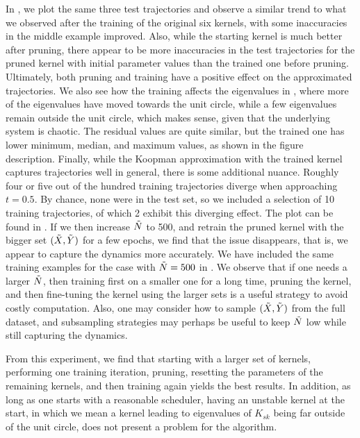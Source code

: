 \documentclass{article}
\begin{document}
In , we plot the same three test trajectories and observe a similar trend to what we observed after the training of the original six kernels, with some inaccuracies in the middle example improved. Also, while the starting kernel is much better after pruning, there appear to be more inaccuracies in the test trajectories for the pruned kernel with initial parameter values than the trained one before pruning. Ultimately, both pruning and training have a positive effect on the approximated trajectories. We also see how the training affects the eigenvalues in , where more of the eigenvalues have moved towards the unit circle, while a few eigenvalues remain outside the unit circle, which makes sense, given that the underlying system is chaotic. The residual values are quite similar, but the trained one has lower minimum, median, and maximum values, as shown in the figure description. Finally, while the Koopman approximation with the trained kernel captures trajectories well in general, there is some additional nuance. Roughly four or five out of the hundred training trajectories diverge when approaching \(t=0.5\). By chance, none were in the test set, so we included a selection of 10 training trajectories, of which 2 exhibit this diverging effect. The plot can be found in . If we then increase \(\Tilde N\) to 500, and retrain the pruned kernel with the bigger set \((\Tilde X, \Tilde Y)\) for a few epochs, we find that the issue disappears, that is, we appear to capture the dynamics more accurately. We have included the same training examples for the case with \(\Tilde N = 500\) in . We observe that if one needs a larger \(\Tilde N\), then training first on a smaller one for a long time, pruning the kernel, and then fine-tuning the kernel using the larger sets is a useful strategy to avoid costly computation. Also, one may consider how to sample \((\Tilde X, \Tilde Y)\) from the full dataset, and subsampling strategies may perhaps be useful to keep \(\Tilde N\) low while still capturing the dynamics.

From this experiment, we find that starting with a larger set of kernels, performing one training iteration, pruning, resetting the parameters of the remaining kernels, and then training again yields the best results. In addition, as long as one starts with a reasonable scheduler, having an unstable kernel at the start, in which we mean a kernel leading to eigenvalues of \(K_{sk}\) being far outside of the unit circle, does not present a problem for the algorithm.
\end{document}
